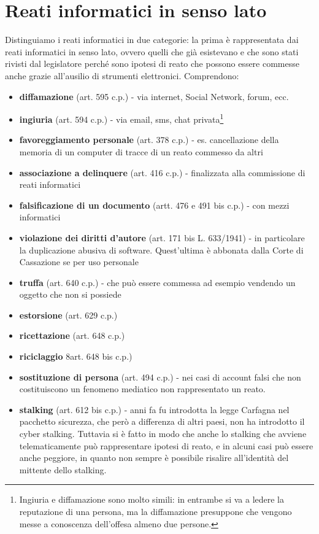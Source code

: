 \section{Reati informatici in senso lato}
Distinguiamo i reati informatici in due categorie: la prima è rappresentata dai reati informatici in senso lato, ovvero quelli che già esistevano e che sono stati rivisti dal legislatore perché sono ipotesi di reato che possono essere commesse anche grazie all'ausilio di strumenti elettronici. Comprendono:
\begin{itemize}
    \item \textbf{diffamazione} (art. 595 c.p.) - via internet, Social Network, forum, ecc.
    \item \textbf{ingiuria} (art. 594 c.p.) - via email, sms, chat privata\footnote{Ingiuria e diffamazione sono molto simili: in entrambe si va a ledere la reputazione di una persona, ma la diffamazione presuppone che vengono messe a conoscenza dell'offesa almeno due persone.}
    \item \textbf{favoreggiamento personale} (art. 378 c.p.) - es. cancellazione della memoria di un computer di tracce di un reato commesso da altri
    \item \textbf{associazione a delinquere} (art. 416 c.p.) - finalizzata alla commissione di reati informatici
    \item \textbf{falsificazione di un documento} (artt. 476 e 491 bis c.p.) - con mezzi informatici
    \item \textbf{violazione dei diritti d'autore} (art. 171 bis L. 633/1941) - in particolare la duplicazione abusiva di software. Quest'ultima è abbonata dalla Corte di Cassazione se per uso personale
    \item \textbf{truffa} (art. 640 c.p.) - che può essere commessa ad esempio vendendo un oggetto che non si possiede
    \item \textbf{estorsione} (art. 629 c.p.)
    \item \textbf{ricettazione} (art. 648 c.p.)
    \item \textbf{riciclaggio} 8art. 648 bis c.p.)
    \item \textbf{sostituzione di persona} (art. 494 c.p.) - nei casi di account falsi che non costituiscono un fenomeno mediatico non rappresentato un reato.
    \item \textbf{stalking} (art. 612 bis c.p.) - anni fa fu introdotta la legge Carfagna nel pacchetto sicurezza, che però a differenza di altri paesi, non ha introdotto il cyber stalking. Tuttavia si è fatto in modo che anche lo stalking che avviene telematicamente può rappresentare ipotesi di reato, e in alcuni casi può essere anche peggiore, in quanto non sempre è possibile risalire all'identità del mittente dello stalking.

\end{itemize}

